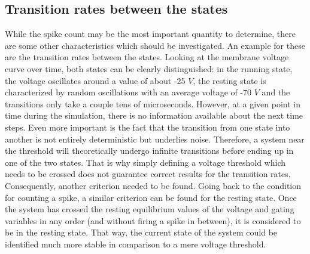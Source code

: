 \documentclass[12pt,a4paper]{article}
\begin{document}
\subsection{Transition rates between the states}
While the spike count may be the most important quantity to determine, there are some other characteristics which should be investigated. An example for these are the transition rates between the states. Looking at the membrane voltage curve over time, both states can be clearly distinguished: in the running state, the voltage oscillates around a value of about -25 $V$, the resting state is characterized by random oscillations with an average voltage of -70 $V$ and the transitions only take a couple tens of microseconds. However, at a given point in time during the simulation, there is no information available about the next time steps. Even more important is the fact that the transition from one state into another is not entirely deterministic but underlies noise. Therefore, a system near the threshold will theoretically undergo infinite transitions before ending up in one of the two states. That is why simply defining a voltage threshold which needs to be crossed does not guarantee correct results for the transition rates. Consequently, another criterion needed to be found. Going back to the condition for counting a spike, a similar criterion can be found for the resting state. Once the system has crossed the resting equilibrium values of the voltage and gating variables in any order (and without firing a spike in between), it is considered to be in the resting state. That way, the current state of the system could be identified much more stable in comparison to a mere voltage threshold.
\end{document}
